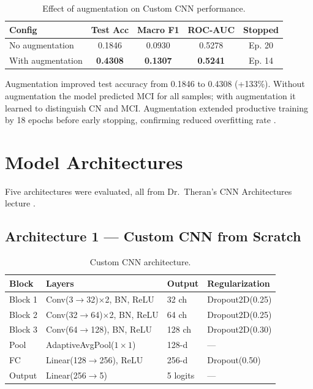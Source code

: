 \documentclass[12pt, a4paper]{article}
\begin{document}
\begin{table}[H]
\centering
\caption{Effect of augmentation on Custom CNN performance.}
\label{tab:aug}
\begin{tabular}{lcccc}
\toprule
\textbf{Config} & \textbf{Test Acc} & \textbf{Macro F1}
    & \textbf{ROC-AUC} & \textbf{Stopped}\\
\midrule
No augmentation   & 0.1846 & 0.0930 & 0.5278 & Ep. 20\\
With augmentation & \textbf{0.4308} & \textbf{0.1307}
    & \textbf{0.5241} & Ep. 14\\
\bottomrule
\end{tabular}
\end{table}

Augmentation improved test accuracy from 0.1846 to 0.4308
(+133\%). Without augmentation the model predicted MCI for
all samples; with augmentation it learned to distinguish
CN and MCI. Augmentation extended productive training by
18 epochs before early stopping, confirming reduced
overfitting rate \cite{lim2022}.

\section{Model Architectures}

Five architectures were evaluated, all from Dr.\ Theran's
CNN Architectures lecture \cite{theran2026cnn}.

\subsection{Architecture 1 --- Custom CNN from Scratch}

\begin{table}[H]
\centering
\caption{Custom CNN architecture.}
\label{tab:arch1}
\begin{tabular}{llll}
\toprule
\textbf{Block} & \textbf{Layers} & \textbf{Output}
    & \textbf{Regularization}\\
\midrule
Block 1 & Conv(3$\to$32)$\times$2, BN, ReLU & 32 ch
    & Dropout2D(0.25)\\
Block 2 & Conv(32$\to$64)$\times$2, BN, ReLU & 64 ch
    & Dropout2D(0.25)\\
Block 3 & Conv(64$\to$128), BN, ReLU & 128 ch
    & Dropout2D(0.30)\\
Pool    & AdaptiveAvgPool($1\times1$) & 128-d & ---\\
FC      & Linear(128$\to$256), ReLU  & 256-d & Dropout(0.50)\\
Output  & Linear(256$\to$5)          & 5 logits & ---\\
\bottomrule
\end{tabular}
\end{table}
\end{document}
